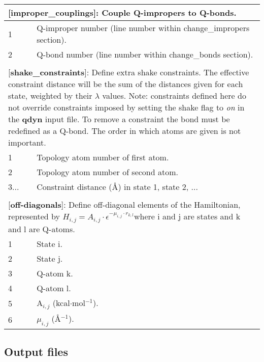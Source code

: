\documentclass[a4paper,10pt]{article}
\begin{document}
\begin{longtable}{|p{53pt}|p{181pt}|p{160pt}|}
\multicolumn{3}{p{394pt}}{[\textbf{improper\_couplings}]: Couple Q-impropers to Q-bonds.}\\
\hline 1 & \multicolumn{2}{p{341pt}|}{Q-improper number (line number within change\_impropers section).}\\
\hline 2 & \multicolumn{2}{p{341pt}|}{Q-bond number (line number within change\_bonds section).}\\
\hline
\multicolumn{3}{p{394pt}}{}\\

\multicolumn{3}{p{394pt}}{[\textbf{shake\_constraints}]: Define extra shake constraints. The effective constraint distance will be the sum of the distances given for each state, weighted by their $\lambda$ values. Note: constraints defined here do not override constraints imposed by setting the shake flag to \emph{on} in the \textbf{qdyn} input file. To remove a constraint the bond must be redefined as a Q-bond. The order in which atoms are given is not important.}\\
\hline 1 & \multicolumn{2}{p{341pt}|}{Topology atom number of first atom.}\\
\hline 2 & \multicolumn{2}{p{341pt}|}{Topology atom number of second atom.}\\
\hline 3... & \multicolumn{2}{p{341pt}|}{Constraint distance (\AA) in state 1, state 2, ...}\\
\hline
\multicolumn{3}{p{394pt}}{}\\

\multicolumn{3}{p{394pt}}{[\textbf{off-diagonals}]: Define off-diagonal elements of the Hamiltonian, represented by $H_{i,j}=A_{i,j}\cdot \epsilon^{-\mu_{i,j}\cdot r_{k,l}}$where i and j are states and k and l are Q-atoms.}\\
\hline 1 & \multicolumn{2}{p{341pt}|}{State i.}\\
\hline 2 & \multicolumn{2}{p{341pt}|}{State j.}\\
\hline 3 & \multicolumn{2}{p{341pt}|}{Q-atom k.}\\
\hline 4 & \multicolumn{2}{p{341pt}|}{Q-atom l.}\\
\hline 5 & \multicolumn{2}{p{341pt}|}{A$_{i,j}$ (kcal$\cdot$mol$^{-1}$).}\\
\hline 6 & \multicolumn{2}{p{341pt}|}{$\mu_{i,j}$ (\AA$^{-1}$).}\\
\hline
\end{longtable}
\normalsize

\subsection{Output files}
\label{subsec:logfiles}
\end{document}

